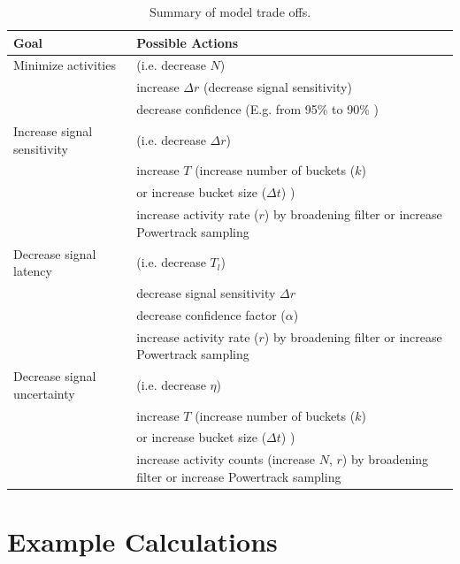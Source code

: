 \documentclass{article}
\begin{document}
\begin{table}[!h]
    \begin{tabular}{ m{4cm}| m{7cm}}
     \hline
Goal  & Possible Actions \\
\hline
Minimize activities  & (i.e. decrease $N$)  \\
                                  & increase $\Delta r$ (decrease signal sensitivity)  \\
                                  & decrease confidence (E.g. from 95\% to 90\% )  \\
\hline	
Increase signal sensitivity   & (i.e. decrease $\Delta r$)  \\
                                  & increase $T$ (increase number of buckets ($k$)  \\
                                  & or increase bucket size ($\Delta t$) )  \\
                                  & increase activity rate ($r$) by broadening filter or increase Powertrack sampling \\
\hline
Decrease signal latency      & (i.e. decrease $T_l$)  \\
                                 & decrease signal sensitivity $\Delta r$  \\
                                 & decrease confidence factor ($\alpha$) \\
                                 & increase activity rate ($r$) by broadening filter or increase Powertrack sampling \\
\hline
Decrease signal uncertainty & (i.e. decrease $\eta$) \\ %
                          	 & increase $T$ (increase number of buckets ($k$)  \\
                                 & or increase bucket size ($\Delta t$) )  \\
                                 & increase activity counts (increase $N$, $r$) by broadening filter or increase Powertrack sampling \\
\hline
\end{tabular}
\caption{Summary of model trade offs.}
\label{tab:tradeoff}

\end{table}

\section{Example Calculations} 
\end{document}
